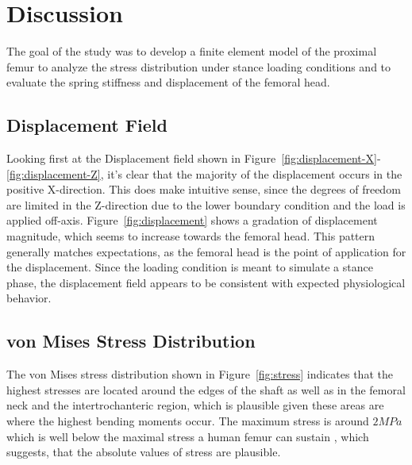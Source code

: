 \documentclass[a4paper,12pt]{article}
\begin{document}
    \section{Discussion}\label{sec:discussion}
    The goal of the study was to develop a finite element model of the proximal femur to analyze the stress distribution under stance loading conditions and to evaluate the spring stiffness and displacement of the femoral head.

    \subsection{Displacement Field}\label{subsec:displacement-field}
    Looking first at the Displacement field shown in Figure~\ref{fig:displacement-X}-\ref{fig:displacement-Z}, it's clear that the majority of the displacement occurs in the positive X-direction.
    This does make intuitive sense, since the degrees of freedom are limited in the Z-direction due to the lower boundary condition and the load is applied off-axis.
    Figure~\ref{fig:displacement} shows a gradation of displacement magnitude, which seems to increase towards the femoral head.
    This pattern generally matches expectations, as the femoral head is the point of application for the displacement.
    Since the loading condition is meant to simulate a stance phase, the displacement field appears to be consistent with expected physiological behavior.

    \subsection{von Mises Stress Distribution}\label{subsec:von-mises-stress-distribution}
    The von Mises stress distribution shown in Figure~\ref{fig:stress} indicates that the highest stresses are located around the edges of the shaft as well as in the femoral neck and the intertrochanteric region, which is plausible given these areas are where the highest bending moments occur.
    The maximum stress is around $2 MPa$ which is well below the maximal stress a human femur can sustain \cite{dall2013nonlinear}, which suggests, that the absolute values of stress are plausible.
\end{document}
